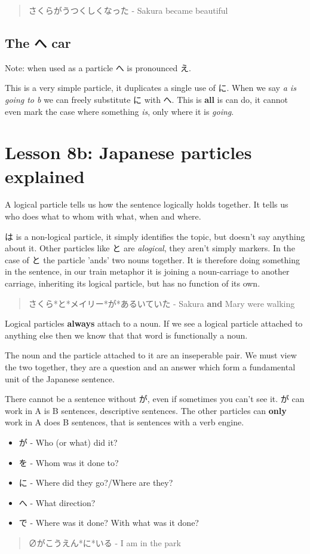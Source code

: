 \documentclass[11pt]{article}
\begin{document}
\begin{quote}
さくらがうつくしくなった - Sakura became beautiful
\end{quote}

\subsection{The へ car}
\label{sec:org9b3eb04}
Note: when used as a particle へ is pronounced え.

This is a very simple particle, it duplicates a single use of に. When we say \emph{a is going to b} we can freely substitute に with へ. This is \textbf{all} is can do, it cannot even mark the case where something \emph{is}, only where it is \emph{going}.
\section{Lesson 8b: Japanese particles explained}
\label{sec:org1a8420a}
A logical particle tells us how the sentence logically holds together. It tells us who does what to whom with what, when and where.

は is a non-logical particle, it simply identifies the topic, but doesn't say anything about it. Other particles like と are \emph{alogical}, they aren't simply markers. In the case of と the particle 'ands' two nouns together. It is therefore doing something in the sentence, in our train metaphor it is joining a noun-carriage to another carriage, inheriting its logical particle, but has no function of its own.
\begin{quote}
さくら*と*メイリー*が*あるいていた - Sakura \textbf{and} Mary were walking
\end{quote}

Logical particles \textbf{always} attach to a noun. If we see a logical particle attached to anything else then we know that that word is functionally a noun.

The noun and the particle attached to it are an inseperable pair. We must view the two together, they are a question and an answer which form a fundamental unit of the Japanese sentence.

There cannot be a sentence without が, even if sometimes you can't see it. が can work in A is B sentences, descriptive sentences. The other particles can \textbf{only} work in A does B sentences, that is sentences with a verb engine.
\begin{itemize}
\item が - Who (or what) did it?
\item を - Whom was it done to?
\item に - Where did they go?/Where are they?
\item へ - What direction?
\item で - Where was it done? With what was it done?
\end{itemize}
\begin{quote}
∅がこうえん*に*いる - I am in the park
\end{quote}
\end{document}
